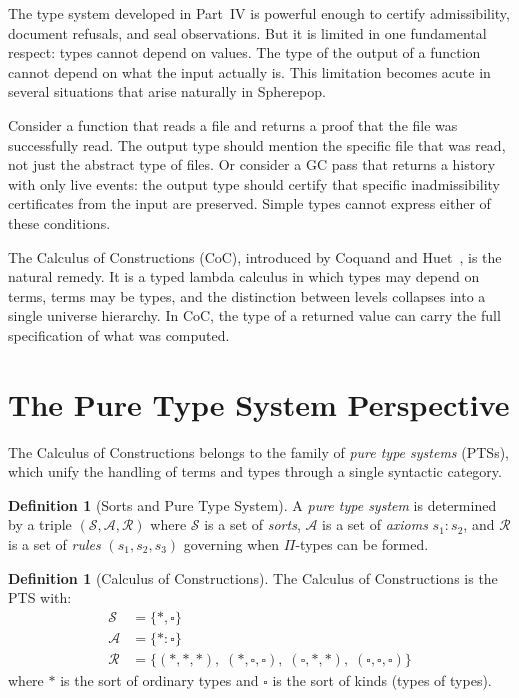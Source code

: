 \documentclass[12pt, a4paper, openany]{book}
\theoremstyle{plain}
\theoremstyle{definition}
\newtheorem{definition}[theorem]{Definition}
\theoremstyle{remark}
\begin{document}
The type system developed in Part~IV is powerful enough to certify admissibility,
document refusals, and seal observations. But it is limited in one fundamental
respect: types cannot depend on values. The type of the output of a function cannot
depend on what the input actually is. This limitation becomes acute in several
situations that arise naturally in Spherepop.

Consider a function that reads a file and returns a proof that the file was
successfully read. The output type should mention the specific file that was read,
not just the abstract type of files. Or consider a GC pass that returns a history
with only live events: the output type should certify that specific inadmissibility
certificates from the input are preserved. Simple types cannot express either of
these conditions.

The Calculus of Constructions (CoC), introduced by Coquand and Huet~\cite{coquand88},
is the natural remedy. It is a typed lambda calculus in which types may depend on
terms, terms may be types, and the distinction between levels collapses into a
single universe hierarchy. In CoC, the type of a returned value can carry the full
specification of what was computed.

\section{The Pure Type System Perspective}

The Calculus of Constructions belongs to the family of \emph{pure type systems}
(PTSs), which unify the handling of terms and types through a single syntactic
category.

\begin{definition}[Sorts and Pure Type System]
A \emph{pure type system} is determined by a triple $(\mathcal{S}, \mathcal{A},
\mathcal{R})$ where $\mathcal{S}$ is a set of \emph{sorts}, $\mathcal{A}$ is a
set of \emph{axioms} $s_1 : s_2$, and $\mathcal{R}$ is a set of \emph{rules}
$(s_1, s_2, s_3)$ governing when $\Pi$-types can be formed.
\end{definition}

\begin{definition}[Calculus of Constructions]
The Calculus of Constructions is the PTS with:
\begin{align*}
\mathcal{S} &= \{\ast, \square\} \\
\mathcal{A} &= \{\ast : \square\} \\
\mathcal{R} &= \{(\ast, \ast, \ast),\; (\ast, \square, \square),\;
                 (\square, \ast, \ast),\; (\square, \square, \square)\}
\end{align*}
where $\ast$ is the sort of ordinary types and $\square$ is the sort of kinds
(types of types).
\end{definition}
\end{document}
